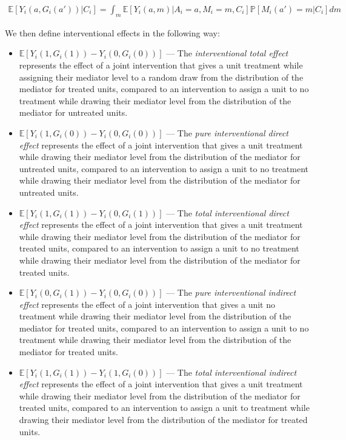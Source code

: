 \begin{equation}\label{eq:RIE_one_mediator_g_comp}
\begin{aligned}
	\mathbb{E}[Y_{i}(a,G_{i}(a'))|C_{i}] = 
	\int_{m} \mathbb{E}[Y_{i}(a,m)|A_{i} = a, M_{i} = m, C_{i}]\mathbb{P}[M_{i}(a') = m|C_{i}]dm
\end{aligned}
\end{equation}

We then define interventional effects in the following way: 

\begin{itemize}[noitemsep,topsep=0pt]
\item  $\mathbb{E}[Y_{i}(1,G_{i}(1)) - Y_{i}(0,G_{i}(0))]$ --- The \textit{interventional total effect} 
represents the effect of a joint intervention that gives a unit treatment while assigning their mediator 
level to a random draw from the distribution of the mediator for treated units, compared to an intervention
to assign a unit to no treatment while drawing their mediator level from the distribution of the mediator for 
untreated units. 
\item  $\mathbb{E}[Y_{i}(1,G_{i}(0)) - Y_{i}(0,G_{i}(0))]$ --- The \textit{pure interventional direct effect} 
represents the effect of a joint intervention that gives a unit treatment while drawing their mediator level 
from the distribution of the mediator for untreated units, compared to an intervention
to assign a unit to no treatment while drawing their mediator level from the distribution of the mediator for 
untreated units. 
\item  $\mathbb{E}[Y_{i}(1,G_{i}(1)) - Y_{i}(0,G_{i}(1))]$ --- The \textit{total interventional direct effect} 
represents the effect of a joint intervention that gives a unit treatment while drawing their mediator level 
from the distribution of the mediator for treated units, compared to an intervention
to assign a unit to no treatment while drawing their mediator level from the distribution of the mediator for 
treated units. 
\item  $\mathbb{E}[Y_{i}(0,G_{i}(1)) - Y_{i}(0,G_{i}(0))]$ --- The \textit{pure interventional indirect effect} 
represents the effect of a joint intervention that gives a unit no treatment while drawing their mediator level 
from the distribution of the mediator for treated units, compared to an intervention
to assign a unit to no treatment while drawing their mediator level from the distribution of the mediator for 
treated units.
\item  $\mathbb{E}[Y_{i}(1,G_{i}(1)) - Y_{i}(1,G_{i}(0))]$ --- The \textit{total interventional indirect effect} 
represents the effect of a joint intervention that gives a unit treatment while drawing their mediator level 
from the distribution of the mediator for treated units, compared to an intervention
to assign a unit to treatment while drawing their mediator level from the distribution of the mediator for 
treated units.
\end{itemize}

